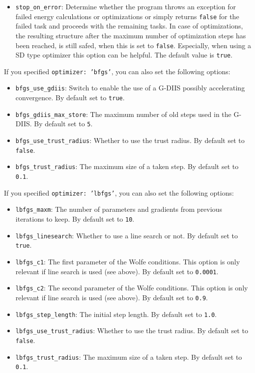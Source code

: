 \documentclass[]{tufte-book}
\begin{document}
\begin{itemize}
\item \texttt{stop\_on\_error}: Determine whether the program throws an exception for failed energy calculations or optimizations or simply returns \texttt{false} for the failed task and proceeds with the remaining tasks. In case of optimizations, the resulting structure after the maximum number of optimization steps has been reached, is still safed, when this is set to \texttt{false}. Especially, when using a SD type optimizer this option can be helpful. The default value is \texttt{true}.
\end{itemize}

If you specified \texttt{optimizer: 'bfgs'}, you can also set the following options:
\begin{itemize}
\item \texttt{bfgs\_use\_gdiis}: Switch to enable the use of a G-DIIS possibly accelerating convergence. By default set to
\texttt{true}.
\item \texttt{bfgs\_gdiis\_max\_store}: The maximum number of old steps used in the G-DIIS. By default set to \texttt{5}.
\item \texttt{bfgs\_use\_trust\_radius}: Whether to use the trust radius. By default set to \texttt{false}.
\item \texttt{bfgs\_trust\_radius}: The maximum size of a taken step. By default set to \texttt{0.1}.
\end{itemize}

If you specified \texttt{optimizer: 'lbfgs'}, you can also set the following options:
\begin{itemize}
\item \texttt{lbfgs\_maxm}: The number of parameters and gradients from previous iterations to keep. By default set to
\texttt{10}.
\item \texttt{lbfgs\_linesearch}: Whether to use a line search or not. By default set to \texttt{true}.
\item \texttt{lbfgs\_c1}: The first parameter of the Wolfe conditions. This option is only relevant if line search is
used (see above). By default set to \texttt{0.0001}.
\item \texttt{lbfgs\_c2}:  The second parameter of the Wolfe conditions. This option is only relevant if line search is
used (see above). By default set to \texttt{0.9}.
\item \texttt{lbfgs\_step\_length}: The initial step length. By default set to \texttt{1.0}.
\item \texttt{lbfgs\_use\_trust\_radius}: Whether to use the trust radius. By default set to \texttt{false}.
\item \texttt{lbfgs\_trust\_radius}: The maximum size of a taken step. By default set to \texttt{0.1}.
\end{itemize}
\end{document}
